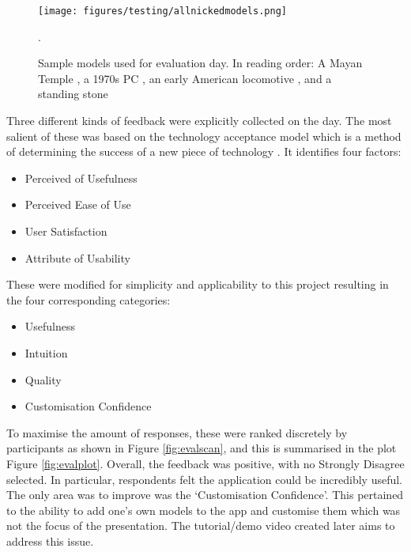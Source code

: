 \documentclass[12pt, a4paper]{article}
\begin{document}
\begin{figure}
    \texttt{[image: figures/testing/allnickedmodels.png]}
        \caption{Sample models used for evaluation day. In reading order: A Mayan Temple \cite{testing:mayantemple}, a 1970s PC \cite{testing:computer}, an early American locomotive \cite{testing:locomotive}, and a standing stone \cite{testing:standingstone}}.
        \label{fig:evalmodels}
\end{figure}

Three different kinds of feedback were explicitly collected on the day. The most salient of these was based on the technology acceptance model which is a method of determining the success of a new piece of technology \cite{testing:acceptancemodel}. It identifies four factors:
\begin{itemize}
    \item Perceived of Usefulness
    \item Perceived Ease of Use
    \item User Satisfaction
    \item Attribute of Usability
\end{itemize}
These were modified for simplicity and applicability to this project resulting in the four corresponding categories:
\begin{itemize}
    \item Usefulness
    \item Intuition
    \item Quality
    \item Customisation Confidence
\end{itemize}
To maximise the amount of responses, these were ranked discretely by participants as shown in Figure \ref{fig:evalscan}, and this is summarised in the plot Figure \ref{fig:evalplot}. Overall, the feedback was positive, with no Strongly Disagree selected. In particular, respondents felt the application could be incredibly useful. The only area was to improve was the `Customisation Confidence'. This pertained to the ability to add one's own models to the app and customise them which was not the focus of the presentation. The tutorial/demo video created later aims to address this issue.
\end{document}
